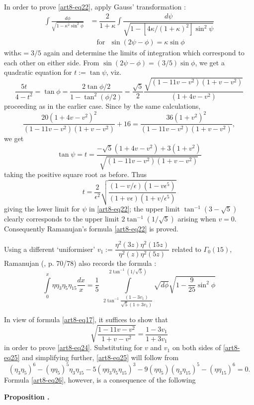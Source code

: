In order to prove \eqref{art8-eq22}, apply Gauss' transformation \cite{art8-key12} :
\begin{align*}
\int \frac{d\phi}{\sqrt{1-\kappa^{2}\sin^{2}\phi}} &=\dfrac{2}{1+\kappa}\int \dfrac{d\psi}{\sqrt{1-[4\kappa/(1+\kappa)^{2}]\sin^{2}\psi}}\\
&\quad \text{for~ }\sin(2\psi-\phi)=\kappa\sin \phi
\end{align*}
with\pageoriginale $\kappa=3/5$ again and determine the limits of integration which correspond to each other on either side. From $\sin(2\psi-\phi)=(3/5)\sin \phi$, we get a quadratic equation for $t:=\tan\psi$, viz.
$$
\frac{5t}{4-t^{2}}=\tan\phi = \frac{2\tan\phi/2}{1-\tan^{2}(\phi/2)}=\frac{\sqrt{5}}{2}\dfrac{\sqrt{(1-11v-v^{2})(1+v-v^{2})}}{(1+4v-v^{2})}
$$
proceeding as in the earlier case. Since by the same calculations,
$$
\frac{20(1+4v-v^{2})^{2}}{(1-11v-v^{2})(1+v-v^{2})}+16=\dfrac{36(1+v^{2})^{2}}{(1-11v-v^{2})(1+v-v^{2})},
$$
we get
$$
\tan \psi=t=\dfrac{-\sqrt{5}(1+4v-v^{2})+3(1+v^{2})}{\sqrt{(1-11v-v^{2})(1+v-v^{2})}}
$$
taking the positive square root as before. Thus 
$$
t=\dfrac{2}{\epsilon^{2}}\sqrt{\dfrac{(1-v/\epsilon)(1-v\epsilon^{5})}{(1+v\epsilon)(1+v/\epsilon^{5})}}
$$
giving the lower limit for $\psi$ in \eqref{art8-eq22}; the upper limit $\tan^{-1}(3-\sqrt{5})$ clearly corresponds to the upper limit $2\tan^{-1}(1/\sqrt{5})$ arising when $v=0$. Consequently Ramanujan's formula \eqref{art8-eq22} is proved.

Using a different `uniformiser' $v_{1}:=\dfrac{\eta^{2}(3z)\eta^{2}(15z)}{\eta^{2}(z)\eta^{2}(5z)}$ related to $\Gamma_{0}(15)$, Ramanujan (\cite{art8-key11}, p. 70/78) also records the formula :
\begin{equation}
\int\limits^{x}_{0}\eta\eta_{3}\eta_{5}\eta_{15}\dfrac{dx}{x}=\dfrac{1}{5} \ \ \int\limits^{2\tan^{-1}(1/\sqrt{5})}_{2\tan^{-1}\dfrac{(1-3v_{1})}{\sqrt{5}(1+3v_{1})}}\sqrt{d\phi}{\sqrt{1-\frac{9}{25}\sin^{2}\phi}}\label{art8-eq24}
\end{equation}

In view of formula \eqref{art8-eq17}, it suffices to show that
\begin{equation}
\sqrt{\frac{1-11v-v^{2}}{1+v-v^{2}}}=\frac{1-3v_{1}}{1+3v_{1}}\label{art8-eq25}
\end{equation}
in order to prove \eqref{art8-eq24}. Substituting for $v$ and $v_{1}$ on both sides of \eqref{art8-eq25} and simplifying further, \eqref{art8-eq25} will follow from
\begin{equation}
(\eta_{3}\eta_{5})^{6}-(\eta\eta_{5})^{5}\eta_{3}\eta_{15}-5(\eta\eta_{3}\eta_{5}\eta_{15})^{3}-9(\eta\eta_{5})(\eta_{3}\eta_{15})^{5}-(\eta\eta_{15})^{6}=0.\label{art8-eq26}
\end{equation}
Formula \eqref{art8-eq26}, however, is a consequence of the following

\medskip
\noindent
{\bf Proposition .\label{art8-prop27}}~\pageoriginale


